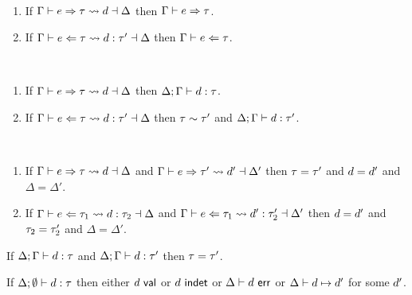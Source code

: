 \begin{theorem} ~
  \begin{enumerate}
    \item If $\Gamma \vdash e \Rightarrow \tau \leadsto d \dashv \Delta$ then $\Gamma \vdash e \Rightarrow \tau$.
    \item If $\Gamma \vdash e \Leftarrow \tau \leadsto d : \tau' \dashv \Delta$ then $\Gamma \vdash e \Leftarrow \tau$.
  \end{enumerate}
\end{theorem}

\begin{theorem} ~
  \begin{enumerate}
    \item If $\Gamma \vdash e \Rightarrow \tau \leadsto d \dashv \Delta$ then $\Delta; \Gamma \vdash d : \tau$.
    \item If $\Gamma \vdash e \Leftarrow \tau \leadsto d : \tau' \dashv \Delta$ then $\tau \sim \tau'$ and $\Delta; \Gamma \vdash d : \tau'$.
  \end{enumerate}
\end{theorem}

\begin{theorem} ~
  \begin{enumerate}
    \item If $\Gamma \vdash e \Rightarrow \tau \leadsto d \dashv \Delta$ and $\Gamma \vdash e \Rightarrow \tau' \leadsto d' \dashv \Delta'$ then $\tau=\tau'$ and $d=d'$ and $\Delta=\Delta'$.
    \item If $\Gamma \vdash e \Leftarrow \tau_1 \leadsto d : \tau_2 \dashv \Delta$ and $\Gamma \vdash e \Leftarrow \tau_1 \leadsto d' : \tau_2' \dashv \Delta'$ then $d=d'$ and $\tau_2=\tau_2'$ and $\Delta=\Delta'$.
  \end{enumerate}
\end{theorem}

\begin{theorem}
If $\Delta; \Gamma \vdash d : \tau$ and $\Delta; \Gamma \vdash d : \tau'$ then $\tau=\tau'$.
\end{theorem}

\begin{theorem}[Progress]
If $\Delta; \emptyset \vdash d : \tau$ then either
$d~\mathsf{val}$ or $d~\mathsf{indet}$ or $\Delta \vdash d~\mathsf{err}$ or
$\Delta \vdash d \mapsto d'$ for some $d'$.
\end{theorem}

